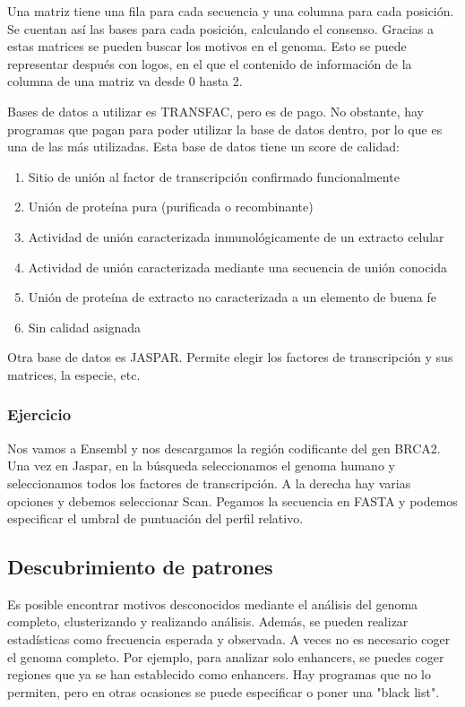 Una matriz tiene una fila para cada secuencia y una columna para cada posición. Se cuentan así las bases para cada posición, calculando el consenso. Gracias a estas matrices se pueden buscar los motivos en el genoma. Esto se puede representar después con logos, en el que el contenido de información de la columna de una matriz va desde 0 hasta 2. 

Bases de datos a utilizar es TRANSFAC, pero es de pago. No obstante, hay programas que pagan para poder utilizar la base de datos dentro, por lo que es una de las más utilizadas. Esta base de datos tiene un score de calidad:
\begin{enumerate}
\item Sitio de unión al factor de transcripción confirmado funcionalmente
\item Unión de proteína pura (purificada o recombinante)
\item Actividad de unión caracterizada inmunológicamente de un extracto celular
\item Actividad de unión caracterizada mediante una secuencia de unión conocida
\item Unión de proteína de extracto no caracterizada a un elemento de buena fe
\item Sin calidad asignada
\end{enumerate}

Otra base de datos es JASPAR. Permite elegir los factores de transcripción y sus matrices, la especie, etc. 

\subsubsection{Ejercicio}
Nos vamos a Ensembl y nos descargamos la región codificante del gen BRCA2. Una vez en Jaspar, en la búsqueda seleccionamos el genoma humano y seleccionamos todos los factores de transcripción. A la derecha hay varias opciones y debemos seleccionar Scan. Pegamos la secuencia en FASTA y podemos especificar el umbral de puntuación del perfil relativo. 

\subsection{Descubrimiento de patrones}
Es posible encontrar motivos desconocidos mediante el análisis del genoma completo, clusterizando y realizando análisis. Además, se pueden realizar estadísticas como frecuencia esperada y observada. A veces no es necesario coger el genoma completo. Por ejemplo, para analizar solo enhancers, se puedes coger regiones que ya se han establecido como enhancers. Hay programas que no lo permiten, pero en otras ocasiones se puede especificar o poner una "black list". 

